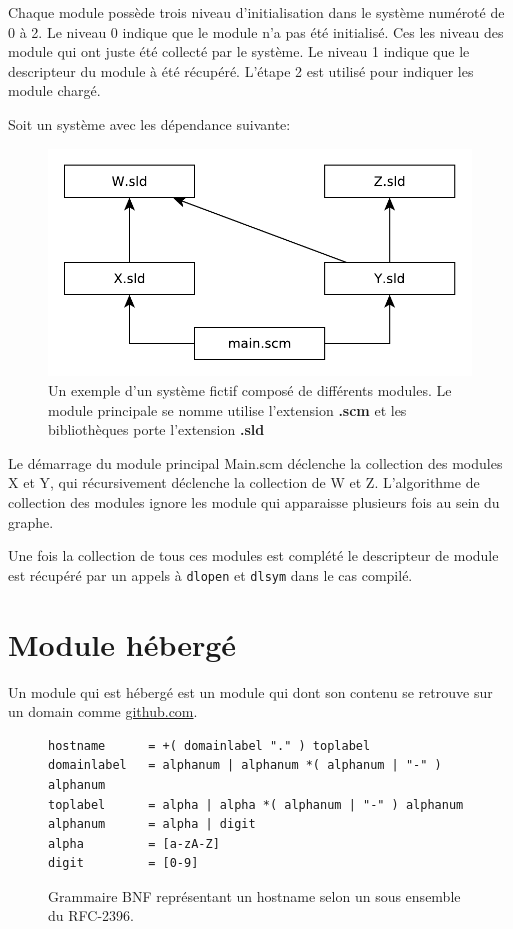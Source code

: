 Chaque module possède trois niveau d'initialisation dans le système numéroté de
0 à 2. Le niveau 0 indique que le module n'a pas été initialisé. Ces les niveau
des module qui ont juste été collecté par le système. Le niveau 1 indique que
le descripteur du module à été récupéré. L'étape 2 est utilisé pour indiquer
les module chargé.

Soit un système avec les dépendance suivante:
\begin{figure}[ht]
  \includegraphics{figures/system-example}
  \caption{Un exemple d'un système fictif composé de différents modules.
  Le module principale se nomme utilise l'extension \textbf{.scm}
  et les bibliothèques porte l'extension \textbf{.sld}}
\end{figure} %


Le démarrage du module principal Main.scm déclenche la collection des modules X
et Y, qui récursivement déclenche la collection de W et Z. L'algorithme de
collection des modules ignore les module qui apparaisse plusieurs fois au sein
du graphe.

Une fois la collection de tous ces modules est complété le descripteur de
module est récupéré par un appels à \verb|dlopen| et \verb|dlsym| dans le cas
compilé.


\section{Module hébergé}

Un module qui est hébergé est un module qui dont son contenu
se retrouve sur un domain comme \url{github.com}.


\begin{figure}[ht]
\begin{lstlisting}
hostname      = +( domainlabel "." ) toplabel
domainlabel   = alphanum | alphanum *( alphanum | "-" ) alphanum
toplabel      = alpha | alpha *( alphanum | "-" ) alphanum
alphanum      = alpha | digit
alpha         = [a-zA-Z]
digit         = [0-9]
\end{lstlisting}
  \caption{Grammaire BNF représentant un hostname selon un sous
  ensemble du RFC-2396.}
\end{figure}

